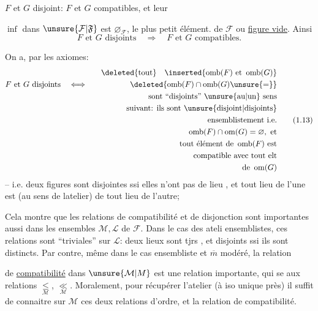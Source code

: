 $F$ et $G$ disjoint: $F$ et $G$ compatibles, et leur

$\inf$ dans $\unsure{\mathcal{F}|\mathfrak{F}}$ est $\varnothing_{\mathcal{F}}$, le plus petit élément. de $\mathcal{F}$ ou \uline{figure vide}. Ainsi
\[
F\text{ et }G\text{ disjoints}\quad\Longrightarrow\quad F\text{ et }G\text{ compatibles}.
\]

On a, par les axiomes:
\[
\begin{aligned}
&&\deleted{\text{tout}}\quad\inserted{\operatorname{omb}(F)\text{ et }\operatorname{omb}(G)}\\
F\text{ et }G\text{ disjoints}&\quad\Longleftrightarrow\quad&\deleted{\operatorname{omb}(F)\cap\operatorname{omb}(G)\unsure{=}}\\
&&\text{sont ``disjoints'' \unsure{au|un} sens}\\
&&\text{suivant: ils sont \unsure{disjoint|disjoints}}\\
&&\text{ensemblistement i.e.}\\
&&\operatorname{omb}(F)\cap\operatorname{om}(G)=\varnothing,\ \text{et}\\
&&\text{tout élément de }\operatorname{omb}(F)\text{ est}\\
&&\text{compatible avec tout elt}\\
&&\text{de }\operatorname{om}(G)
\end{aligned}\tag*{(1.13)}
\]
-- i.e. deux figures sont disjointes ssi elles n'ont pas de lieu , et tout lieu de l'une est   (au sens de latelier) de tout lieu de l'autre;

Cela montre que les relations de compatibilité et de disjonction sont importantes aussi dans les  ensembles $\mathcal{M},\mathcal{L}$ de $\mathcal{F}$. Dans le cas des ateli ensemblistes, ces relations sont ``triviales'' sur $\mathcal{L}$: deux lieux sont tjrs  , et disjoints ssi ils sont distincts. Par contre, même dans le cas ensembliste et $\overline m$ modéré, la relation

\makeatletter\tagsleft@true\makeatother
de \uline{compatibilité} dans $\unsure{\mathcal{M}|M}$ est une  relation importante, qui se  aux relations $\underset{\mathcal{M}}{\leq}$, $\underset{\mathcal{M}}{\ll}$. Moralement, pour récupérer l'atelier (à iso unique près) il suffit de connaitre sur $\mathcal{M}$ ces deux relations d'ordre, et la relation de compatibilité.

